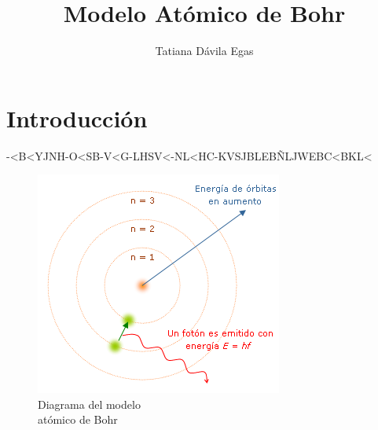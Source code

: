 \documentclass[12pt,a4paper]{article}
\author{Tatiana Dávila Egas}
\title{Modelo Atómico de Bohr}
\date{}
\begin{document}
\maketitle
\section{Introducción}
-<B<YJNH-O<SB-V<G-LHSV<-NL<HC-KVSJBLEBÑLJWEBC<BKL<
\begin{figure}[!ht]
\includegraphics[scale=0.6]{Modelo_de_Bohr.png}
\centering 
\caption{Diagrama del modelo\\ atómico de Bohr}
\end{figure}
\end{document}

